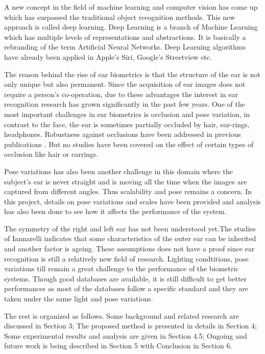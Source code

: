  A new concept in the field of machine learning and computer vision has come up which has surpassed the traditional object recognition methods. This new approach is called deep learning. Deep Learning is a branch of Machine Learning which has multiple levels of representations and abstractions. It is basically a rebranding of the term Artificial Neural Networks. Deep Learning algorithms have already been applied in Apple's Siri, Google's Streetview etc. 
 
 The reason behind the rise of ear biometrics is that the structure of the ear is not only unique but also permanent. Since the acquisition of ear images does not require a person's co-operation, due to these advantages the interest in ear recognition research has grown significantly in the past few years. One of the most important challenges in ear biometrics is occlusion and pose variation, in contrast to the face, the ear is sometimes partially occluded by hair, ear-rings, headphones. Robustness against occlusions have been addressed in previous publications \cite{pflug2012ear}. But no studies have been covered on the effect of certain types of occlusion like hair or earrings. 
 
 Pose variations has also been another challenge in this domain where the subject's ear is never straight and is moving all the time when the images are captured from different angles. Thus scalability and pose remains a concern. In this project, details on pose variations and scales have been provided and analysis has also been done to see how it affects the performance of the system.
 
 The symmetry of the right and left ear has not been understood yet.The studies of Iannarelli indicates that some characteristics of the outer ear can be inherited and another factor is ageing. These assumptions does not have a proof since ear recognition is still a relatively new field of research. Lighting condtitions, pose variations till remain a great challenge to the performance of the biometric systems. Though good databases are available, it is still difficult to get better performances as most of the databases follow a specific standard and they are taken under the same light and pose variations.
 
 

The rest  is organized as follows. Some background and related research are discussed in Section 3; The proposed method is presented in details in Section 4; Some experimental results and analysis are given in Section 4.5; Ongoing and future work is being described in Section 5 with Conclusion in Section 6.